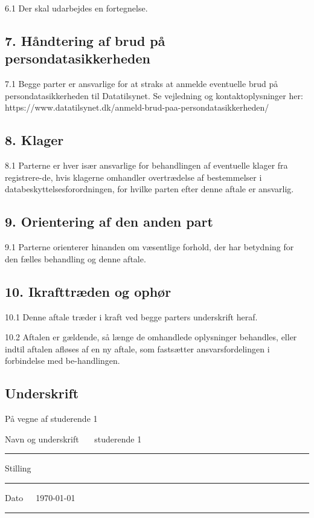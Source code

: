 \documentclass[11pt, a4paper]{article}
\newcommand{\studerendeET}{ studerende 1 }	 		%
\begin{document}
6.1 Der skal udarbejdes en fortegnelse.

\subsection*{7. Håndtering af brud på persondatasikkerheden}

7.1 Begge parter er ansvarlige for at straks at anmelde eventuelle brud på persondatasikkerheden til Datatilsynet. Se vejledning og kontaktoplysninger her:\\{\color{blue}https://www.datatilsynet.dk/anmeld-brud-paa-persondatasikkerheden/}

\subsection*{8. Klager}

8.1 Parterne er hver især ansvarlige for behandlingen af eventuelle klager fra registrere-de, hvis klagerne omhandler overtrædelse af bestemmelser i databeskyttelsesforordningen, for hvilke parten efter denne aftale er ansvarlig.

\subsection*{9. Orientering af den anden part}

9.1 Parterne orienterer hinanden om væsentlige forhold, der har betydning for den fælles behandling og denne aftale.

\subsection*{10. Ikrafttræden og ophør}

10.1 Denne aftale træder i kraft ved begge parters underskrift heraf.

10.2 Aftalen er gældende, så længe de omhandlede oplysninger behandles, eller indtil aftalen afløses af en ny aftale, som fastsætter ansvarsfordelingen i forbindelse med be-handlingen.




\subsection*{Underskrift}

På vegne af \studerendeET

Navn og underskrift~~~\studerendeET
\vspace{1mm}
\hrule
\vspace{5mm}
Stilling~~~
\vspace{1mm}
\hrule
\vspace{5mm}
Dato~~~\today
\vspace{1mm}
\hrule
\end{document}
